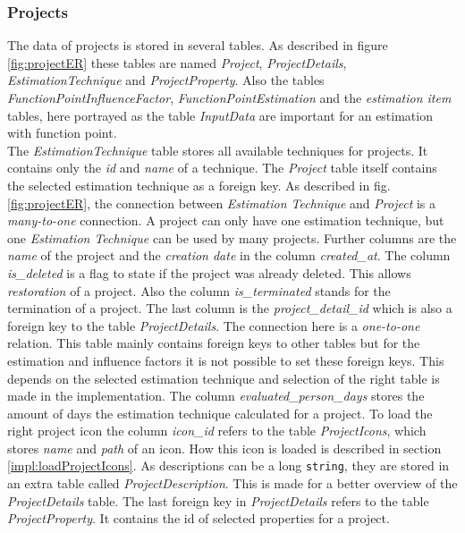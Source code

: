 \subsubsection{Projects}

The data of projects is stored in several tables. As described in figure \ref{fig:projectER} these tables are named \textit{Project}, \textit{ProjectDetails}, \textit{EstimationTechnique} and \textit{ProjectProperty}. Also the tables \textit{FunctionPointInfluenceFactor}, \textit{FunctionPointEstimation} and the \textit{estimation item} tables, here portrayed as the table \textit{InputData} are important for an estimation with function point.\\
The \textit{EstimationTechnique} table stores all available techniques for projects. It contains only the \textit{id} and \textit{name} of a technique. The \textit{Project} table itself contains the selected estimation technique as a foreign key. As described in fig. \ref{fig:projectER}, the connection between \textit{Estimation Technique} and \textit{Project} is a \textit{many-to-one} connection. A project can only have one estimation technique, but one \textit{Estimation Technique} can be used by many projects. Further columns are the \textit{name} of the project and the \textit{creation date} in the column \textit{created\_at}. The column \textit{is\_deleted} is a flag to state if the project was already deleted. This allows \textit{restoration} of a project. Also the column \textit{is\_terminated} stands for the termination of a project. The last column is the \textit{project\_detail\_id} which is also a foreign key to the table \textit{ProjectDetails}. The connection here is a \textit{one-to-one} relation. This table mainly contains foreign keys to other tables but for the estimation and influence factors it is not possible to set these foreign keys. This depends on the selected estimation technique and selection of the right table is made in the implementation. The column \textit{evaluated\_person\_days} stores the amount of days the estimation technique calculated for a project. To load the right project icon the column \textit{icon\_id} refers to the table \textit{ProjectIcons}, which stores \textit{name} and \textit{path} of an icon. How this icon is loaded is described in section \ref{impl:loadProjectIcons}. As descriptions can be a long \texttt{string}, they are stored in an extra table called \textit{ProjectDescription}. This is made for a better overview of the \textit{ProjectDetails} table. The last foreign key in \textit{ProjectDetails} refers to the table \textit{ProjectProperty}. It contains the id of selected properties for a project.\\
